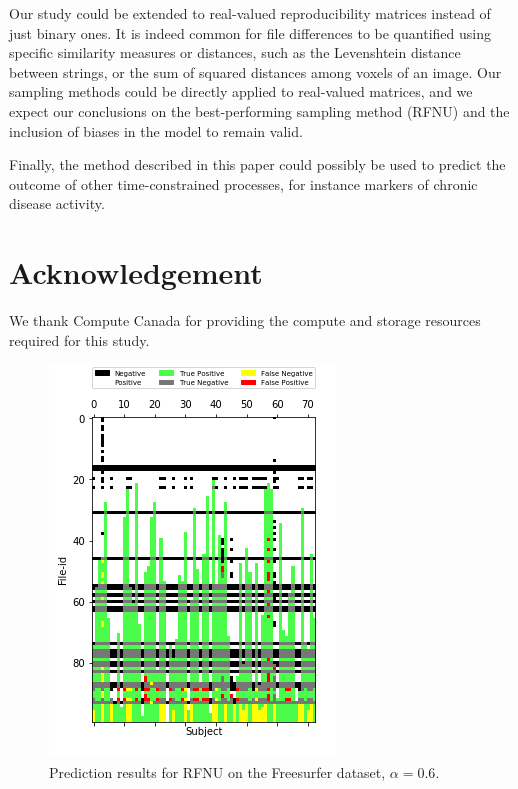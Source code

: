 \documentclass[10pt, conference, compsocconf]{IEEEtran}
\begin{document}
Our study could be extended to real-valued reproducibility 
matrices instead of just binary ones. It is indeed common for file 
differences to be quantified using specific similarity measures or 
distances, such as the Levenshtein distance between strings, or the sum of 
squared distances among voxels of an image. Our sampling methods 
could be directly applied to real-valued matrices, and we expect our 
conclusions on the best-performing sampling method (RFNU) and 
the inclusion of biases in the model to remain valid.


Finally, the method described in this paper could possibly be used to predict 
the outcome of other time-constrained processes, for instance 
markers of chronic disease activity.

\section*{Acknowledgement}

We thank Compute Canada for providing the compute and storage resources
required for this study.




\begin{figure}
\centering
\includegraphics[width=0.6\columnwidth]{figures/RFNU_FS100F_ALS_06_test_data_matrix_run1.png}
\caption{Prediction results for RFNU on the Freesurfer dataset, $\alpha=0.6$.}
\label{fig:error-locality}
\end{figure}
\end{document}
